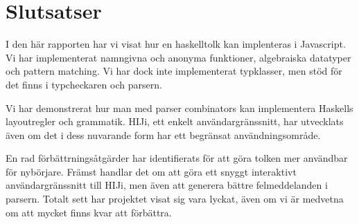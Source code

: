 \section{Slutsatser}
I den här rapporten har vi visat hur en haskelltolk kan implenteras i Javascript.
Vi har implementerat namngivna och anonyma funktioner, algebraiska datatyper och pattern matching. 
Vi har dock inte implementerat typklasser, men stöd för det finns i typcheckaren och parsern. 

Vi har demonstrerat hur man med parser combinators kan implementera Haskells layoutregler och grammatik. HIJi, ett enkelt användargränssnitt, har utvecklats även om det i dess nuvarande form har ett begränsat användningsområde.

En rad förbättrningsåtgärder har identifierats för att göra tolken mer användbar för nybörjare. Främst handlar det om att göra ett snyggt interaktivt användargränssnitt till HIJi, men även att generera bättre felmeddelanden i parsern. 
Totalt sett har projektet visat sig vara lyckat, även om vi är medvetna om att mycket finns kvar att förbättra.
